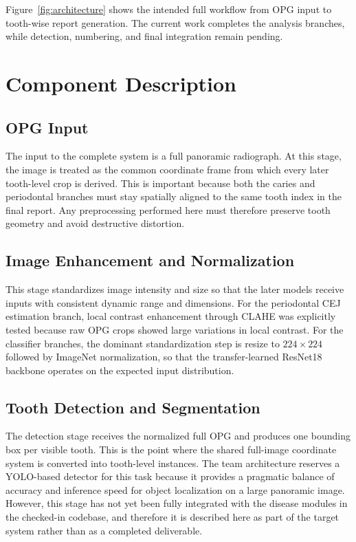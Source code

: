Figure~\ref{fig:architecture} shows the intended full workflow from OPG input
to tooth-wise report generation. The current work completes the analysis
branches, while detection, numbering, and final integration remain pending.

\section{Component Description}
\label{sec:arch-components}

\subsection{OPG Input}
The input to the complete system is a full panoramic radiograph. At this stage,
the image is treated as the common coordinate frame from which every later
tooth-level crop is derived. This is important because both the caries and
periodontal branches must stay spatially aligned to the same tooth index in the
final report. Any preprocessing performed here must therefore preserve tooth
geometry and avoid destructive distortion.

\subsection{Image Enhancement and Normalization}
This stage standardizes image intensity and size so that the later models
receive inputs with consistent dynamic range and dimensions. For the
periodontal CEJ estimation branch, local contrast enhancement through CLAHE was
explicitly tested because raw OPG crops showed large variations in local
contrast. For the classifier branches, the dominant standardization step is
resize to \(224 \times 224\) followed by ImageNet normalization, so that the
transfer-learned ResNet18 backbone operates on the expected input distribution.

\subsection{Tooth Detection and Segmentation}
The detection stage receives the normalized full OPG and produces one bounding
box per visible tooth. This is the point where the shared full-image coordinate
system is converted into tooth-level instances. The team architecture reserves a
YOLO-based detector for this task because it provides a pragmatic balance of
accuracy and inference speed for object localization on a large panoramic
image. However, this stage has not yet been fully integrated with the disease
modules in the checked-in codebase, and therefore it is described here as part
of the target system rather than as a completed deliverable.

